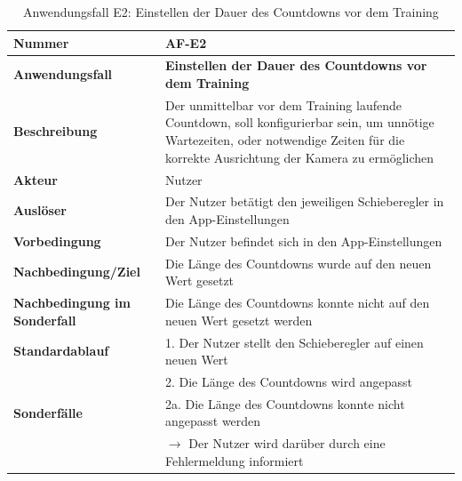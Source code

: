 \documentclass[oneside]{ausarbeitung}
\begin{document}
\begin{table}[htbp]
	\centering
	\begin{tabular}{|l|p{80mm}|}
		\hline
		\textbf{Nummer} & \textbf{AF-E2} \\ \hline
		\textbf{Anwendungsfall} & \textbf{Einstellen der Dauer des Countdowns vor dem Training} \\ \hline
		\textbf{Beschreibung} & Der unmittelbar vor dem Training laufende Countdown, soll konfigurierbar sein, um unnötige Wartezeiten, oder notwendige Zeiten für die korrekte Ausrichtung der Kamera zu ermöglichen \\ \hline
		\textbf{Akteur} & Nutzer \\ \hline
		\textbf{Auslöser} & Der Nutzer betätigt den jeweiligen Schieberegler in den App-Einstellungen \\ \hline
		\textbf{Vorbedingung} & Der Nutzer befindet sich in den App-Einstellungen \\ \hline	
		\textbf{Nachbedingung/Ziel} & Die Länge des Countdowns wurde auf den neuen Wert gesetzt \\ \hline
		\textbf{Nachbedingung im Sonderfall} & Die Länge des Countdowns konnte nicht auf den neuen Wert gesetzt werden \\ \hline
		\textbf{Standardablauf} & 1. Der Nutzer stellt den Schieberegler auf einen neuen Wert \\ 
		& 2. Die Länge des Countdowns wird angepasst \\ \hline
		\textbf{Sonderfälle} & 2a. Die Länge des Countdowns konnte nicht angepasst werden \\ & $\rightarrow$ Der Nutzer wird darüber durch eine Fehlermeldung informiert \\ \hline
		
	\end{tabular}
	\caption{Anwendungsfall E2: Einstellen der Dauer des Countdowns vor dem Training}
	\label{tab:use-case-set-countdown}
\end{table}
\end{document}
